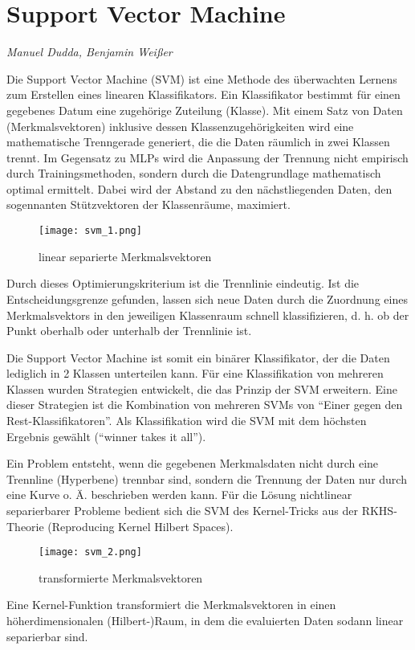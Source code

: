 \section{Support Vector Machine}
\textit{Manuel Dudda, Benjamin Weißer}

Die Support Vector Machine (SVM) ist eine Methode des überwachten Lernens zum Erstellen eines linearen Klassifikators. Ein Klassifikator bestimmt für einen gegebenes Datum eine zugehörige Zuteilung (Klasse). Mit einem Satz von Daten (Merkmalsvektoren) inklusive dessen Klassenzugehörigkeiten wird eine mathematische Trenngerade generiert, die die Daten räumlich in zwei Klassen trennt. Im Gegensatz zu MLPs wird die Anpassung der Trennung nicht empirisch durch Trainingsmethoden, sondern durch die Datengrundlage mathematisch optimal ermittelt. Dabei wird der Abstand zu den nächstliegenden Daten, den sogennanten Stützvektoren der Klassenräume, maximiert.

\begin{wrapfigure}{r}{0.48\textwidth}
	\vspace{-30pt}
	\begin{center}
		 \texttt{[image: svm\_1.png]}
	\end{center}
	\vspace{-15pt}
	\caption{linear separierte Merkmalsvektoren}
	\vspace{-15pt} 
\end{wrapfigure}

Durch dieses Optimierungskriterium ist die Trennlinie eindeutig. Ist die Entscheidungsgrenze gefunden, lassen sich neue Daten durch die Zuordnung eines Merkmalsvektors in den jeweiligen Klassenraum schnell klassifizieren, d. h. ob der Punkt oberhalb oder unterhalb der Trennlinie ist.

Die Support Vector Machine ist somit ein binärer Klassifikator, der die Daten lediglich in 2 Klassen unterteilen kann. Für eine Klassifikation von mehreren Klassen wurden Strategien entwickelt, die das Prinzip der SVM erweitern. Eine dieser Strategien ist die Kombination von mehreren SVMs von “Einer gegen den Rest-Klassifikatoren”. Als Klassifikation wird die SVM mit dem höchsten Ergebnis gewählt (“winner takes it all”).

Ein Problem entsteht, wenn die gegebenen Merkmalsdaten nicht durch eine Trennline (Hyperbene) trennbar sind, sondern die Trennung der Daten nur durch eine Kurve o. Ä. beschrieben werden kann. Für die Lösung nichtlinear separierbarer Probleme bedient sich die SVM des Kernel-Tricks aus der RKHS-Theorie (Reproducing Kernel Hilbert Spaces). 
\begin{wrapfigure}{l}{0.45\textwidth}
	\vspace{-30pt}
	\begin{center}
	    \texttt{[image: svm\_2.png]}
	\end{center}
	\vspace{-15pt}
	\caption{transformierte Merkmalsvektoren}
		\vspace{-65pt}
\end{wrapfigure}
Eine Kernel-Funktion transformiert die Merkmalsvektoren in einen höherdimensionalen (Hilbert-)Raum, in dem die evaluierten Daten sodann linear separierbar sind.


